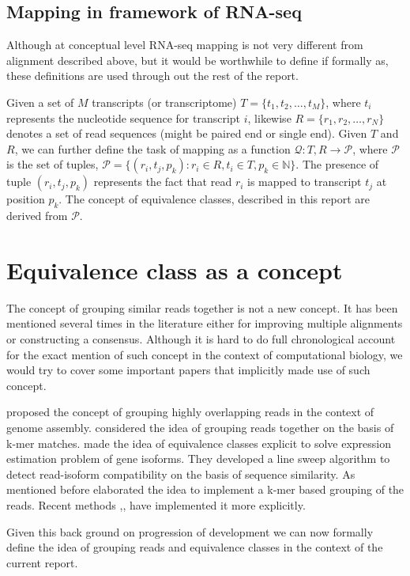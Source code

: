 \subsection{Mapping in framework of RNA-seq}
Although at conceptual level RNA-seq mapping is not very different from alignment described above, but it would be worthwhile to define if formally as, these definitions are used through out the rest of the report.

Given a set of $M$ transcripts (or transcriptome) $T = \{t_1,t_2,\ldots,t_M\}$, where $t_i$ represents the nucleotide sequence for transcript $i$, likewise  $R = \{r_1,r_2,\ldots,r_N\}$ denotes a set of read sequences (might be paired end or single end). Given $T$ and $R$, we can further define the task of mapping as a function $\mathcal{Q} : {T,R} \rightarrow \mathcal{P}$, where $\mathcal{P}$ is the set of tuples, $\mathcal{P} = \{(r_i,t_j,p_k) : r_i \in R, t_i \in T, p_k \in \mathbb{N}\}$. The presence of tuple $(r_i,t_j,p_k)$ represents the fact that read $r_i$ is mapped to transcript $t_j$ at position $p_k$. The concept of equivalence classes, described in this report are derived from $\mathcal{P}$.  

\section{Equivalence class as a concept}

The concept of grouping similar reads together is not a new concept. It has been mentioned several times in the literature either for improving multiple alignments or constructing a consensus. Although it is hard to do full chronological account for the exact mention of such concept in the context of computational biology, we would try to cover some important papers that implicitly made use of such concept. 

\citet{pop2004} proposed the concept of grouping highly overlapping reads in the context of genome assembly. \citet{Salmela2011} considered the idea of grouping reads together on the basis of k-mer matches. \citet{isoem} made the idea of equivalence classes explicit to solve expression estimation problem of gene isoforms. They developed a line sweep algorithm to detect read-isoform compatibility on the basis of sequence similarity. As mentioned before \citep{sailfish} elaborated the idea to implement a k-mer based grouping of the reads. Recent methods \citep{kallisto},\citep{salmon},\citep{rapmap} have implemented it more explicitly. 

Given this back ground on progression of development we can now formally define the idea of grouping reads and equivalence classes in the context of the current report.  

